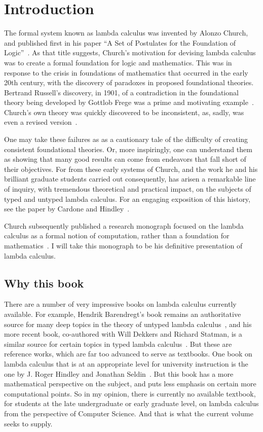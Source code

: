 \chapter{Introduction}

The formal system known as lambda calculus was invented by Alonzo
Church, and published first in his paper ``A Set of Postulates for the
Foundation of Logic''~\cite{church32}.  As that title suggests,
Church's motivation for devising lambda calculus was to create a
formal foundation for logic and mathematics.  This was in response to
the crisis in foundations of mathematics that occurred in the early
20th century, with the discovery of paradoxes in proposed foundational
theories.  Bertrand Russell's discovery, in 1901, of a contradiction
in the foundational theory being developed by Gottlob Frege was a
prime and motivating example~\cite{Whitehead:268025}.  Church's own
theory was quickly discovered to be inconsistent, as, sadly, was even
a revised version~\cite{church33}.  

One may take these failures as as a cautionary tale of the difficulty
of creating consistent foundational theories.  Or, more inspiringly,
one can understand them as showing that many good results can come
from endeavors that fall short of their objectives.  For from these
early systems of Church, and the work he and his brilliant graduate
students carried out consequently, has arisen a remarkable line of
inquiry, with tremendous theoretical and practical impact, on the
subjects of typed and untyped lambda calculus.  For an engaging
exposition of this history, see the paper by Cardone
and Hindley~\cite{cardone09}.

Church subsequently published a research monograph focused on the
lambda calculus as a formal notion of computation, rather than a
foundation for mathematics~\cite{church41}.  I will take this
monograph to be his definitive presentation of lambda calculus.

\section{Why this book}

There are a number of very impressive books on lambda calculus
currently available.  For example, Hendrik Barendregt's book remains
an authoritative source for many deep topics in the theory of untyped
lambda calculus~\cite{barendregt85}, and his more recent book,
co-authored with Will Dekkers and Richard Statman, is a similar source
for certain topics in typed lambda calculus~\cite{barendregt+13}.  But
these are reference works, which are far too advanced to serve as
textbooks.  One book on lambda calculus that is at an appropriate
level for university instruction is the one by J. Roger Hindley and
Jonathan Seldin~\cite{hindley+08}.  But this book has a more
mathematical perspective on the subject, and puts less emphasis on
certain more computational points.  So in my opinion, there is
currently no available textbook, for students at the late
undergraduate or early graduate level, on lambda calculus from the
perspective of Computer Science.  And that is what the current
volume seeks to supply.
